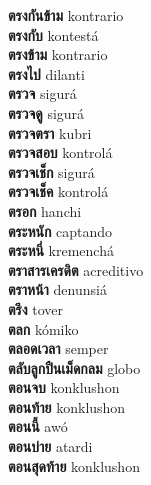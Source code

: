 \textbf{ ตรงกันข้าม  } kontrario \\
\textbf{ ตรงกับ  } kontestá \\
\textbf{ ตรงข้าม  } kontrario \\
\textbf{ ตรงไป  } dilanti \\
\textbf{ ตรวจ  } sigurá \\
\textbf{ ตรวจดู  } sigurá \\
\textbf{ ตรวจตรา  } kubri \\
\textbf{ ตรวจสอบ  } kontrolá \\
\textbf{ ตรวจเช็ก  } sigurá \\
\textbf{ ตรวจเช็ค  } kontrolá \\
\textbf{ ตรอก  } hanchi \\
\textbf{ ตระหนัก  } captando \\
\textbf{ ตระหนี่  } kremenchá \\
\textbf{ ตราสารเครดิต  } acreditivo \\
\textbf{ ตราหน้า  } denunsiá \\
\textbf{ ตรึง  } tover \\
\textbf{ ตลก  } kómiko \\
\textbf{ ตลอดเวลา  } semper \\
\textbf{ ตลับลูกปืนเม็ดกลม  } globo \\
\textbf{ ตอนจบ  } konklushon \\
\textbf{ ตอนท้าย  } konklushon \\
\textbf{ ตอนนี้  } awó \\
\textbf{ ตอนบ่าย  } atardi \\
\textbf{ ตอนสุดท้าย  } konklushon \\
